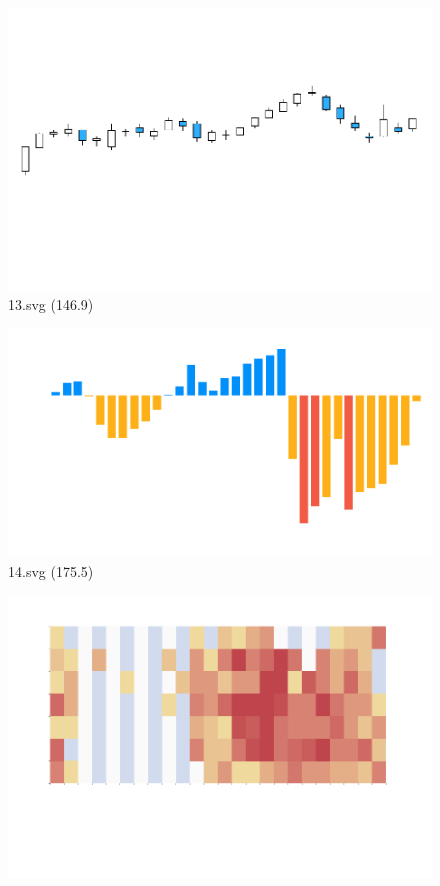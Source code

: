 \documentclass[journal]{IEEEtran}
\begin{document}
\begin{figure}[!htbp]
\centering
\begin{minipage}{0.233\columnwidth}
\centering
\includegraphics[width=\textwidth]{Test_set/13.pdf}
{13.svg (146.9)}
\end{minipage}
\hfill
\begin{minipage}{0.233\columnwidth}
\centering
\includegraphics[width=\textwidth]{Test_set/14.pdf}
{14.svg (175.5)}
\end{minipage}
\hfill
\begin{minipage}{0.233\columnwidth}
\centering
\includegraphics[width=\textwidth]{Test_set/15.pdf}

\end{minipage}
\end{figure}
\end{document}
